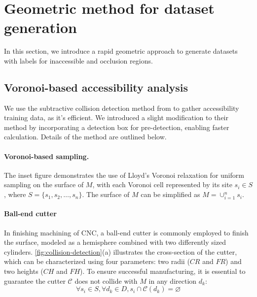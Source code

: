 \section{Geometric method for dataset generation}
\label{sec:Overview}
In this section, we introduce a rapid geometric approach to generate datasets with labels for inaccessible and occlusion regions.



\subsection{Voronoi-based accessibility analysis}
\label{sec:acc}
We use the subtractive collision detection method from \cite{zhong2023vasco} to gather accessibility training data, as it's efficient. 
We introduced a slight modification to their method by incorporating a detection box for pre-detection, enabling faster calculation.
Details of the method are outlined below.

\paragraph{Voronoi-based sampling.} The inset figure demonstrates the use of  Lloyd's Voronoi relaxation for uniform sampling on the surface of $M$, with each Voronoi cell represented by its site $s_i\in S$, where $S = \{ s_1, s_2, \dots, s_n \}$. The surface of $M$ can be simplified as $M = \cup_{i=1}^n s_i$.

\paragraph{Ball-end cutter} 
In finishing machining of CNC, a ball-end cutter is commonly employed to finish the surface, modeled as a hemisphere combined with two differently sized cylinders.
\autoref{fig:collision-detection}(a) illustrates the cross-section of the cutter, which can be characterized using four parameters: two radii ($CR$ and $FR$) and two heights ($CH$ and $FH$). To ensure successful manufacturing, it is essential to guarantee the cutter $\mathcal{C}$ does not collide with $M$ in any direction $d_k$:
\begin{equation} 
\forall s_i \in S, \forall d_k \in D, s_i \cap \mathcal{C}(d_k) = \varnothing
\end{equation}

